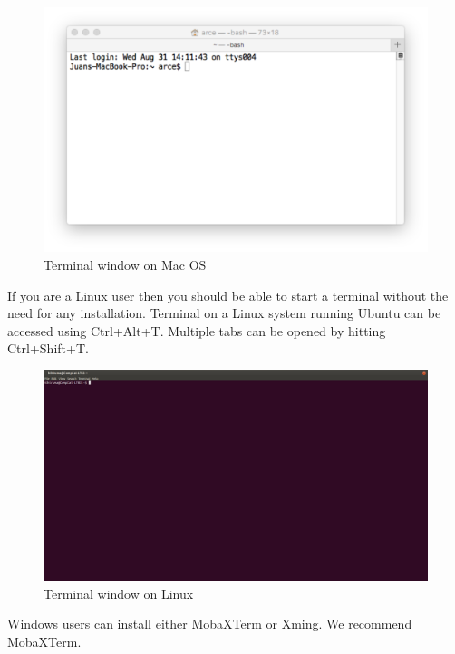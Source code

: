 \documentclass[11pt]{article}
\makeatletter
\def\maxwidth{\ifdim\Gin@nat@width>\linewidth\linewidth
    \else\Gin@nat@width\fi}
\let\Oldincludegraphics\includegraphics
\renewcommand{\includegraphics}[1]{\Oldincludegraphics[width=.8\maxwidth]{#1}}
\makeatother
\begin{document}
\begin{figure}
\centering
\includegraphics{figures/terminal-mac.png}
\caption{Terminal window on Mac OS}
\end{figure}

If you are a Linux user then you should be able to start a terminal
without the need for any installation. Terminal on a Linux system
running Ubuntu can be accessed using Ctrl+Alt+T. Multiple tabs can be
opened by hitting Ctrl+Shift+T.

\begin{figure}
\centering
\includegraphics{figures/Ubuntu-terminal.png}
\caption{Terminal window on Linux}
\end{figure}

Windows users can install either
\href{http://mobaxterm.mobatek.net/}{MobaXTerm} or
\href{http://www.straightrunning.com/XmingNotes/}{Xming}. We recommend
MobaXTerm.
\end{document}
